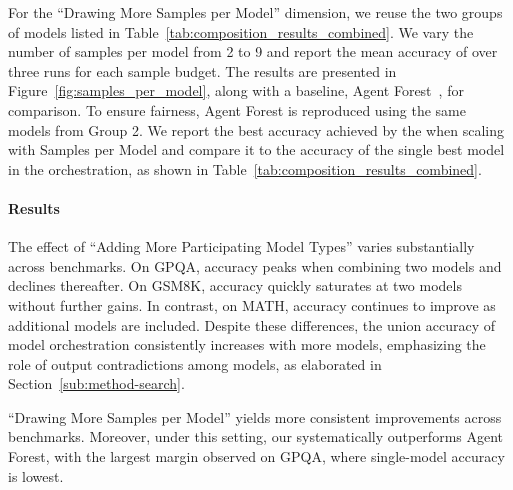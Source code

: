 For the ``Drawing More Samples per Model'' dimension, we reuse the two groups of models listed in Table~\ref{tab:composition_results_combined}. We vary the number of samples per model from 2 to 9 and report the mean accuracy of \NAME{} over three runs for each sample budget. The results are presented in Figure~\ref{fig:samples_per_model}, along with a baseline, Agent Forest~\citep{li2024agentsneed}, for comparison. To ensure fairness, Agent Forest is reproduced using the same models from Group 2. We report the best accuracy achieved by the \NAME{} when scaling with Samples per Model and compare it to the accuracy of the single best model in the orchestration, as shown in Table~\ref{tab:composition_results_combined}. 



\paragraph{Results} The effect of ``Adding More Participating Model Types'' varies substantially across benchmarks. On GPQA, accuracy peaks when combining two models and declines thereafter. On GSM8K, accuracy quickly saturates at two models without further gains. In contrast, on MATH, accuracy continues to improve as additional models are included. Despite these differences, the union accuracy of model orchestration consistently increases with more models, emphasizing the role of output contradictions among models, as elaborated in Section~\ref{sub:method-search}.

``Drawing More Samples per Model'' yields more consistent improvements across benchmarks. Moreover, under this setting, our \NAME{} systematically outperforms Agent Forest, with the largest margin observed on GPQA, where single-model accuracy is lowest. 




